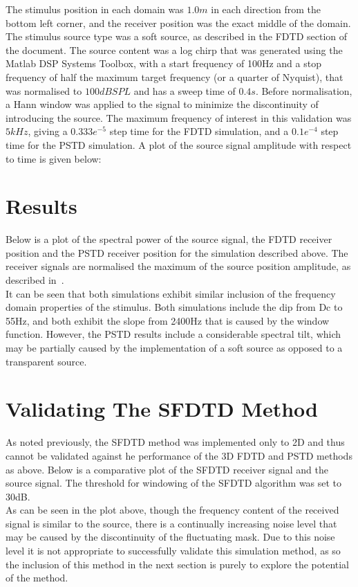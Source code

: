 The stimulus position in each domain was $1.0m$ in each direction from the bottom left corner, and the receiver position was the exact middle of the domain. The stimulus source type was a soft source, as described in the FDTD section of the document. The source content was a log chirp that was generated using the Matlab DSP Systems Toolbox, with a start frequency of 100Hz and a stop frequency of half the maximum target frequency (or a quarter of Nyquist), that was normalised to $100dBSPL$ and has a sweep time of $0.4s$. Before normalisation, a Hann window was applied to the signal to minimize the discontinuity of introducing the source. The maximum frequency of interest in this validation was $5kHz$, giving a $0.333e^{-5}$ step time for the FDTD simulation, and a $0.1e^{-4}$ step time for the PSTD simulation. A plot of the source signal amplitude with respect to time is given below:\\

\section{Results}
Below is a plot of the spectral power of the source signal, the FDTD receiver position and the PSTD receiver position for the simulation described above. The receiver signals are normalised the maximum of the source position amplitude, as described in~\cite{Murphy2014}.\\ 

It can be seen that both simulations exhibit similar inclusion of the frequency domain properties of the stimulus. Both simulations include the dip from Dc to 55Hz, and both exhibit the slope from 2400Hz that is caused by the window function. However, the PSTD results include a considerable spectral tilt, which may be partially caused by the implementation of a soft source as opposed to a transparent source.\\


\section{Validating The SFDTD Method}
As noted previously, the SFDTD method was implemented only to 2D and thus cannot be validated against he performance of the 3D FDTD and PSTD methods as above. Below is a comparative plot of the SFDTD receiver signal and the source signal. The threshold for windowing of the SFDTD algorithm was set to 30dB.\\

As can be seen in the plot above, though the frequency content of the received signal is similar to the source, there is a continually increasing noise level that may be caused by the discontinuity of the fluctuating mask. Due to this noise level it is not appropriate to successfully validate this simulation method, as so the inclusion of this method in the next section is purely to explore the potential of the method.\\ 